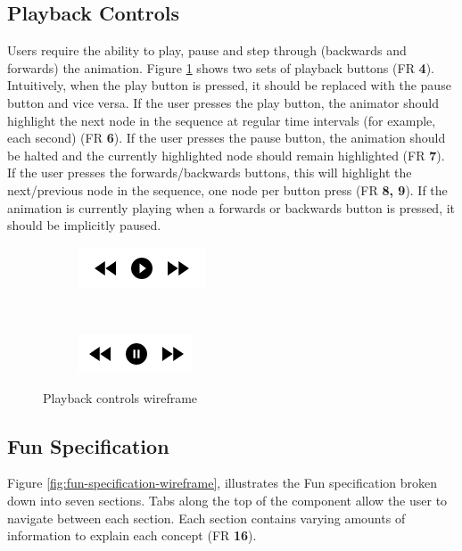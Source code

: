 \documentclass{l4proj}
\begin{document}
\subsection{Playback Controls}
Users require the ability to play, pause and step through (backwards and forwards) the animation. Figure \ref{fig:playback-wireframe} shows two sets of playback buttons (FR \textbf{4}). Intuitively, when the play button is pressed, it should be replaced with the pause button and vice versa. If the user presses the play button, the animator should highlight the next node in the sequence at regular time intervals (for example, each second) (FR \textbf{6}). If the user presses the pause button, the animation should be halted and the currently highlighted node should remain highlighted (FR \textbf{7}). If the user presses the forwards/backwards buttons, this will highlight the next/previous node in the sequence, one node per button press (FR \textbf{8, 9}). If the animation is currently playing when a forwards or backwards button is pressed, it should be implicitly paused.

\begin{figure}[h]
	\centering
	\begin{subfigure}[b]{0.3\textwidth}
		\includegraphics[]{images/playback-play-wireframe.png}
	\end{subfigure}
	~
	\begin{subfigure}[b]{0.3\textwidth}
		\includegraphics[]{images/playback-pause-wireframe.png}
	\end{subfigure}
	\caption{Playback controls wireframe}\label{fig:playback-wireframe}	
\end{figure}

\subsection{Fun Specification}
 Figure \ref{fig:fun-specification-wireframe}, illustrates the Fun specification broken down into seven sections. Tabs along the top of the component allow the user to navigate between each section. Each section contains varying amounts of information to explain each concept (FR \textbf{16}).
 
\end{document}
